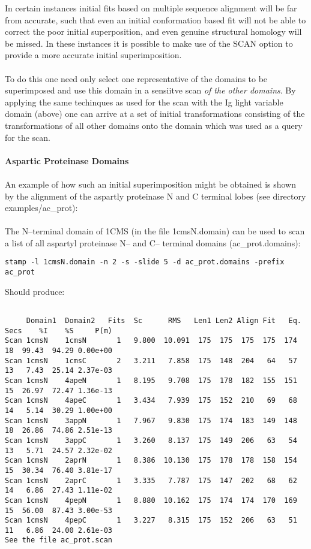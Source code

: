 In certain instances initial fits based on multiple sequence
alignment will be far from accurate, such that even an initial
conformation based fit will not be able to correct the poor
initial superposition, and even genuine structural homology will
be missed.  In these instances it is possible to make use of the
SCAN option to provide a more accurate initial superimposition.\\
\\
To do this one need only select one representative of the
domains to be superimposed and use this domain in a sensiitve
scan {\em of the other domains}.  By applying the same techinques as
used for the scan with the Ig  light variable domain (above) one
can arrive at a set of initial transformations consisting of the
transformations of all other domains onto the domain which was
used as a query for the scan.\\
\\
{\bf Aspartic Proteinase Domains}\\
\\
An example of how such an initial superimposition might be
obtained is shown by the alignment of the aspartly proteinase N
and C terminal lobes (see directory examples/ac\_prot):\\
\\
The N--terminal domain of 1CMS (in the file 1cmsN.domain) can be
used to scan a list of all aspartyl proteinase
N-- and C-- terminal domains (ac\_prot.domains):

\begin{scriptsize}\begin{verbatim}
stamp -l 1cmsN.domain -n 2 -s -slide 5 -d ac_prot.domains -prefix ac_prot
\end{verbatim} \end{scriptsize}

Should produce:

\begin{scriptsize}\begin{verbatim}

     Domain1  Domain2   Fits  Sc      RMS   Len1 Len2 Align Fit   Eq. Secs    %I    %S     P(m)
Scan 1cmsN    1cmsN       1   9.800  10.091  175  175  175  175  174   18  99.43  94.29 0.00e+00 
Scan 1cmsN    1cmsC       2   3.211   7.858  175  148  204   64   57   13   7.43  25.14 2.37e-03 
Scan 1cmsN    4apeN       1   8.195   9.708  175  178  182  155  151   15  26.97  72.47 1.36e-13 
Scan 1cmsN    4apeC       1   3.434   7.939  175  152  210   69   68   14   5.14  30.29 1.00e+00 
Scan 1cmsN    3appN       1   7.967   9.830  175  174  183  149  148   18  26.86  74.86 2.51e-13 
Scan 1cmsN    3appC       1   3.260   8.137  175  149  206   63   54   13   5.71  24.57 2.32e-02 
Scan 1cmsN    2aprN       1   8.386  10.130  175  178  178  158  154   15  30.34  76.40 3.81e-17 
Scan 1cmsN    2aprC       1   3.335   7.787  175  147  202   68   62   14   6.86  27.43 1.11e-02 
Scan 1cmsN    4pepN       1   8.880  10.162  175  174  174  170  169   15  56.00  87.43 3.00e-53 
Scan 1cmsN    4pepC       1   3.227   8.315  175  152  206   63   51   11   6.86  24.00 2.61e-03 
See the file ac_prot.scan
\end{verbatim} \end{scriptsize}


